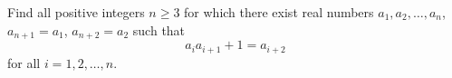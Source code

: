 Find all positive integers $n \geq 3$ for which there exist real numbers $a_1, a_2, \ldots, a_n$, $a_{n+1} = a_1$, $a_{n+2} = a_2$ such that
\[ a_i a_{i+1} + 1 = a_{i+2} \]
for all $i = 1, 2, \ldots, n$.
